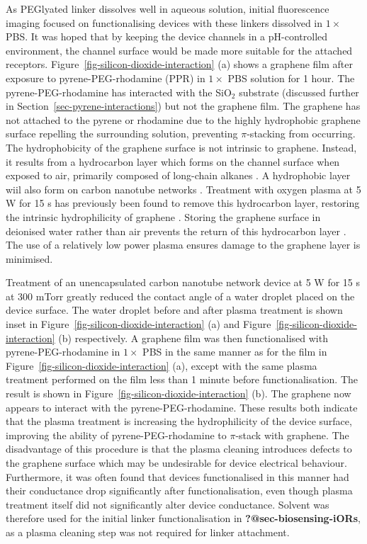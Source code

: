 \documentclass[
  a4paper,
]{scrbook}
\begin{document}
As PEGlyated linker dissolves well in aqueous solution, initial
fluorescence imaging focused on functionalising devices with these
linkers dissolved in \(1 \times\) PBS. It was hoped that by keeping the
device channels in a pH-controlled environment, the channel surface
would be made more suitable for the attached receptors.
Figure~\ref{fig-silicon-dioxide-interaction} (a) shows a graphene film
after exposure to pyrene-PEG-rhodamine (PPR) in \(1 \times\) PBS
solution for 1 hour. The pyrene-PEG-rhodamine has interacted with the
SiO\(_2\) substrate (discussed further in
Section~\ref{sec-pyrene-interactions}) but not the graphene film. The
graphene has not attached to the pyrene or rhodamine due to the highly
hydrophobic graphene surface repelling the surrounding solution,
preventing \(\pi\)-stacking from occurring. The hydrophobicity of the
graphene surface is not intrinsic to graphene. Instead, it results from
a hydrocarbon layer which forms on the channel surface when exposed to
air, primarily composed of long-chain alkanes
\autocite{Ashraf2014,Palinkas2022}. A hydrophobic layer wiil also form
on carbon nanotube networks \autocite{Stando2019,Park2022}. Treatment
with oxygen plasma at 5 W for 15 s has previously been found to remove
this hydrocarbon layer, restoring the intrinsic hydrophilicity of
graphene \autocite{Shin2010}. Storing the graphene surface in deionised
water rather than air prevents the return of this hydrocarbon layer
\autocite{Ashraf2014}. The use of a relatively low power plasma ensures
damage to the graphene layer is minimised.

Treatment of an unencapsulated carbon nanotube network device at 5 W for
15 s at 300 mTorr greatly reduced the contact angle of a water droplet
placed on the device surface. The water droplet before and after plasma
treatment is shown inset in Figure~\ref{fig-silicon-dioxide-interaction}
(a) and Figure~\ref{fig-silicon-dioxide-interaction} (b) respectively. A
graphene film was then functionalised with pyrene-PEG-rhodamine in
\(1 \times\) PBS in the same manner as for the film in
Figure~\ref{fig-silicon-dioxide-interaction} (a), except with the same
plasma treatment performed on the film less than 1 minute before
functionalisation. The result is shown in
Figure~\ref{fig-silicon-dioxide-interaction} (b). The graphene now
appears to interact with the pyrene-PEG-rhodamine. These results both
indicate that the plasma treatment is increasing the hydrophilicity of
the device surface, improving the ability of pyrene-PEG-rhodamine to
\(\pi\)-stack with graphene. The disadvantage of this procedure is that
the plasma cleaning introduces defects to the graphene surface which may
be undesirable for device electrical behaviour. Furthermore, it was
often found that devices functionalised in this manner had their
conductance drop significantly after functionalisation, even though
plasma treatment itself did not significantly alter device conductance.
Solvent was therefore used for the initial linker functionalisation in
\textbf{?@sec-biosensing-iORs}, as a plasma cleaning step was not
required for linker attachment.
\end{document}

